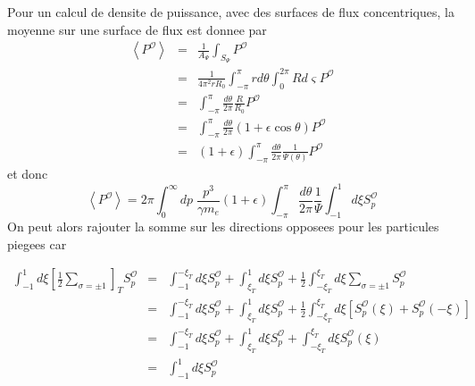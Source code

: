 Pour un calcul de densite de puissance, avec des surfaces de flux
concentriques, la moyenne sur une surface de flux est donnee par \begin{eqnarray*}
\left\langle P^{\mathcal{O}}\right\rangle  & = & \frac{1}{A_{\Psi}}\int_{S_{\Psi}}P^{\mathcal{O}}\\
 & = & \frac{1}{4\pi^{2}rR_{0}}\int_{-\pi}^{\pi}rd\theta\int_{0}^{2\pi}Rd\varsigma P^{\mathcal{O}}\\
 & = & \int_{-\pi}^{\pi}\frac{d\theta}{2\pi}\frac{R}{R_{0}}P^{\mathcal{O}}\\
 & = & \int_{-\pi}^{\pi}\frac{d\theta}{2\pi}(1+\epsilon\cos\theta)P^{\mathcal{O}}\\
 & = & (1+\epsilon)\int_{-\pi}^{\pi}\frac{d\theta}{2\pi}\frac{1}{\Psi(\theta)}P^{\mathcal{O}}\end{eqnarray*}
 et donc \[
\left\langle P^{\mathcal{O}}\right\rangle =2\pi\int_{0}^{\infty}dp\;\frac{p^{3}}{\gamma m_{e}}(1+\epsilon)\int_{-\pi}^{\pi}\frac{d\theta}{2\pi}\frac{1}{\Psi}\int_{-1}^{1}d\xi S_{p}^{\mathcal{O}}\]
 On peut alors rajouter la somme sur les directions opposees pour
les particules piegees car

\begin{eqnarray*}
\int_{-1}^{1}d\xi\left[\frac{1}{2}\sum_{\sigma=\pm1}\right]_{T}S_{p}^{\mathcal{O}} & = & \int_{-1}^{-\xi_{T}}d\xi S_{p}^{\mathcal{O}}+\int_{\xi_{T}}^{1}d\xi S_{p}^{\mathcal{O}}+\frac{1}{2}\int_{-\xi_{T}}^{\xi_{T}}d\xi\sum_{\sigma=\pm1}S_{p}^{\mathcal{O}}\\
 & = & \int_{-1}^{-\xi_{T}}d\xi S_{p}^{\mathcal{O}}+\int_{\xi_{T}}^{1}d\xi S_{p}^{\mathcal{O}}+\frac{1}{2}\int_{-\xi_{T}}^{\xi_{T}}d\xi\left[S_{p}^{\mathcal{O}}(\xi)+S_{p}^{\mathcal{O}}(-\xi)\right]\\
 & = & \int_{-1}^{-\xi_{T}}d\xi S_{p}^{\mathcal{O}}+\int_{\xi_{T}}^{1}d\xi S_{p}^{\mathcal{O}}+\int_{-\xi_{T}}^{\xi_{T}}d\xi S_{p}^{\mathcal{O}}(\xi)\\
 & = & \int_{-1}^{1}d\xi S_{p}^{\mathcal{O}}\end{eqnarray*}


